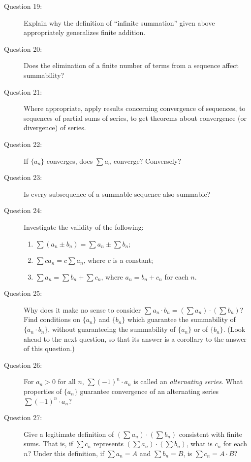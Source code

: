 \documentclass{article}
\begin{document}
\begin{description}
  \item[Question 19:] Explain why the definition of ``infinite summation'' given above appropriately generalizes finite addition.

  \item[Question 20:] Does the elimination of a finite number of terms from a sequence affect summability?

  \item[Question 21:] Where appropriate, apply results concerning convergence of sequences, to sequences of partial sums of series, to get theorems about convergence (or divergence) of series.

  \item[Question 22:] If $\{ a_n \}$ converges, does $\sum a_n$ converge? Conversely?

  \item[Question 23:] Is every subsequence of a summable sequence also summable?

  \item[Question 24:] Investigate the validity of the following:
    \begin{enumerate}[\hspace{1cm}(1)]
      \item $\sum (a_n \pm b_n) = \sum a_n \pm \sum b_n$;
      \item $\sum c a_n = c \sum a_n$, where $c$ is a constant;
      \item $\sum a_n = \sum b_n + \sum c_n$, where $a_n = b_n + c_n$ for each $n$.
    \end{enumerate}

  \item[Question 25:] Why does it make no sense to consider $\sum a_n \cdot b_n = (\sum a_n) \cdot (\sum b_n)$? Find conditions on $\{ a_n \}$ and $\{ b_n \}$ which guarantee the summability of $\{ a_n \cdot b_n \}$, without guaranteeing the summability of $\{ a_n \}$ or of $\{ b_n \}$. (Look ahead to the next question, so that its answer is a corollary to the answer of this question.)

  \item[Question 26:] For $a_n > 0$ for all $n$, $\sum (-1)^n \cdot a_n$ is called an \emph{alternating series}. What properties of $\{ a_n \}$ guarantee convergence of an alternating series $\sum (-1)^n \cdot a_n$?

  \item[Question 27:] Give a legitimate definition of $(\sum a_n) \cdot (\sum b_n)$ consistent with finite sums. That is, if $\sum c_n$ represents $(\sum a_n) \cdot (\sum b_n)$, what is $c_n$ for each $n$? Under this definition, if $\sum a_n = A$ and $\sum b_n = B$, is $\sum c_n = A \cdot B$?


\end{description}
\end{document}
